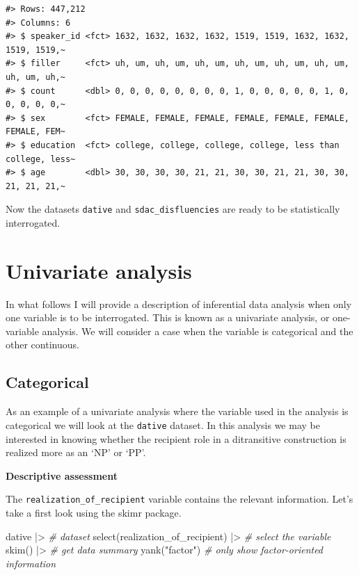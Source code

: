 \documentclass[
  letterpaper,
]{scrbook}
\newenvironment{Shaded}{\begin{snugshade}}{\end{snugshade}}
\newcommand{\CommentTok}[1]{\textcolor[rgb]{0.00,0.00,0.00}{\textit{#1}}}
\newcommand{\FunctionTok}[1]{\textcolor[rgb]{0.00,0.00,0.00}{#1}}
\newcommand{\NormalTok}[1]{\textcolor[rgb]{0.00,0.00,0.00}{#1}}
\newcommand{\SpecialCharTok}[1]{\textcolor[rgb]{0.00,0.00,0.00}{#1}}
\newcommand{\StringTok}[1]{\textcolor[rgb]{0.00,0.00,0.00}{#1}}
\begin{document}
\begin{verbatim}
#> Rows: 447,212
#> Columns: 6
#> $ speaker_id <fct> 1632, 1632, 1632, 1632, 1519, 1519, 1632, 1632, 1519, 1519,~
#> $ filler     <fct> uh, um, uh, um, uh, um, uh, um, uh, um, uh, um, uh, um, uh,~
#> $ count      <dbl> 0, 0, 0, 0, 0, 0, 0, 0, 1, 0, 0, 0, 0, 0, 1, 0, 0, 0, 0, 0,~
#> $ sex        <fct> FEMALE, FEMALE, FEMALE, FEMALE, FEMALE, FEMALE, FEMALE, FEM~
#> $ education  <fct> college, college, college, college, less than college, less~
#> $ age        <dbl> 30, 30, 30, 30, 21, 21, 30, 30, 21, 21, 30, 30, 21, 21, 21,~
\end{verbatim}

Now the datasets \texttt{dative} and \texttt{sdac\_disfluencies} are
ready to be statistically interrogated.

\hypertarget{univariate-analysis}{%
\section{Univariate analysis}\label{univariate-analysis}}

In what follows I will provide a description of inferential data
analysis when only one variable is to be interrogated. This is known as
a univariate analysis, or one-variable analysis. We will consider a case
when the variable is categorical and the other continuous.

\hypertarget{categorical}{%
\subsection{Categorical}\label{categorical}}

As an example of a univariate analysis where the variable used in the
analysis is categorical we will look at the \texttt{dative} dataset. In
this analysis we may be interested in knowing whether the recipient role
in a ditransitive construction is realized more as an `NP' or `PP'.

\textbf{Descriptive assessment}

The \texttt{realization\_of\_recipient} variable contains the relevant
information. Let's take a first look using the skimr package.

\begin{Shaded}
\begin{Highlighting}[]
\NormalTok{dative }\SpecialCharTok{|\textgreater{}} \CommentTok{\# dataset}
  \FunctionTok{select}\NormalTok{(realization\_of\_recipient) }\SpecialCharTok{|\textgreater{}} \CommentTok{\# select the variable}
  \FunctionTok{skim}\NormalTok{() }\SpecialCharTok{|\textgreater{}} \CommentTok{\# get data summary}
  \FunctionTok{yank}\NormalTok{(}\StringTok{"factor"}\NormalTok{) }\CommentTok{\# only show factor{-}oriented information}
\end{Highlighting}
\end{Shaded}
\end{document}

